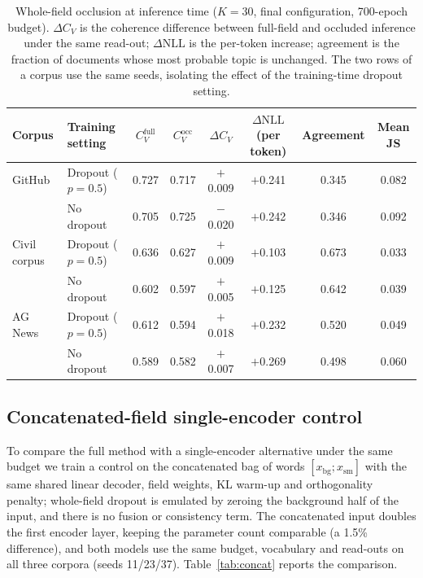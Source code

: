 \documentclass[pdflatex,sn-basic]{sn-jnl}
\begin{document}
\begin{table}[t]
\centering
\caption{Whole-field occlusion at inference time ($K=30$, final configuration, 700-epoch budget). $\Delta C_V$ is the coherence difference between full-field and occluded inference under the same read-out; $\Delta\mathrm{NLL}$ is the per-token increase; agreement is the fraction of documents whose most probable topic is unchanged. The two rows of a corpus use the same seeds, isolating the effect of the training-time dropout setting.}
\label{tab:occlusion}
\small
\setlength{\tabcolsep}{4pt}
\begin{tabular}{llcccccc}
\toprule
Corpus & Training setting & $C_V^{\mathrm{full}}$ & $C_V^{\mathrm{occ}}$ & $\Delta C_V$
 & $\Delta\mathrm{NLL}$(per token) & Agreement & Mean JS \\
\midrule
GitHub & Dropout ($p=0.5$) & 0.727 & 0.717 & $+$0.009 & $+$0.241 & 0.345 & 0.082 \\
       & No dropout & 0.705 & 0.725 & $-$0.020 & $+$0.242 & 0.346 & 0.092 \\
\midrule
Civil corpus & Dropout ($p=0.5$) & 0.636 & 0.627 & $+$0.009 & $+$0.103 & 0.673 & 0.033 \\
        & No dropout & 0.602 & 0.597 & $+$0.005 & $+$0.125 & 0.642 & 0.039 \\
\midrule
AG News & Dropout ($p=0.5$) & 0.612 & 0.594 & $+$0.018 & $+$0.232 & 0.520 & 0.049 \\
        & No dropout & 0.589 & 0.582 & $+$0.007 & $+$0.269 & 0.498 & 0.060 \\
\bottomrule
\end{tabular}
\end{table}

\subsection{Concatenated-field single-encoder control}
To compare the full method with a single-encoder alternative under the same budget we train a
control on the concatenated bag of words $[x_{\mathrm{bg}};x_{\mathrm{sm}}]$ with the same shared
linear decoder, field weights, KL warm-up and orthogonality penalty; whole-field dropout is
emulated by zeroing the background half of the input, and there is no fusion or consistency term.
The concatenated input doubles the first encoder layer, keeping the parameter count comparable (a
1.5\% difference), and both models use the same budget, vocabulary and read-outs on all three
corpora (seeds 11/23/37). Table~\ref{tab:concat} reports the comparison.
\end{document}
